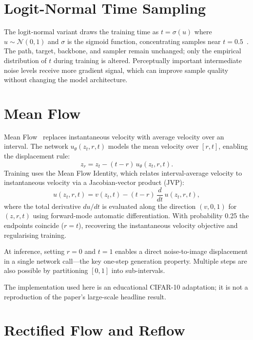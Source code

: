 \section{Logit-Normal Time Sampling}

The logit-normal variant draws the training time as
$t = \sigma(u)$ where $u \sim \mathcal{N}(0, 1)$ and $\sigma$ is the sigmoid
function, concentrating samples near $t = 0.5$~\cite{esser2024scaling}.
The path, target, backbone, and sampler remain unchanged; only the empirical
distribution of $t$ during training is altered. Perceptually important
intermediate noise levels receive more gradient signal, which can improve
sample quality without changing the model architecture.

\section{Mean Flow}

Mean Flow~\cite{geng2025mean} replaces instantaneous velocity with average
velocity over an interval. The network $u_\theta(z_t, r, t)$ models the
mean velocity over $[r, t]$, enabling the displacement rule:
\begin{equation}
  z_r = z_t - (t - r)\,u_\theta(z_t, r, t).
\end{equation}
Training uses the Mean Flow Identity, which relates interval-average velocity
to instantaneous velocity via a Jacobian-vector product (JVP):
\begin{equation}
  u(z_t, r, t)
    = v(z_t, t)
      - (t - r)\,\frac{d}{dt}\,u(z_t, r, t),
\end{equation}
where the total derivative $du/dt$ is evaluated along the direction
$(v, 0, 1)$ for $(z, r, t)$ using forward-mode automatic differentiation.
With probability 0.25 the endpoints coincide ($r = t$), recovering the
instantaneous velocity objective and regularising training.

At inference, setting $r = 0$ and $t = 1$ enables a direct noise-to-image
displacement in a single network call---the key one-step generation property.
Multiple steps are also possible by partitioning $[0,1]$ into sub-intervals.

The implementation used here is an educational CIFAR-10 adaptation;
it is not a reproduction of the paper's large-scale headline result.

\section{Rectified Flow and Reflow}

